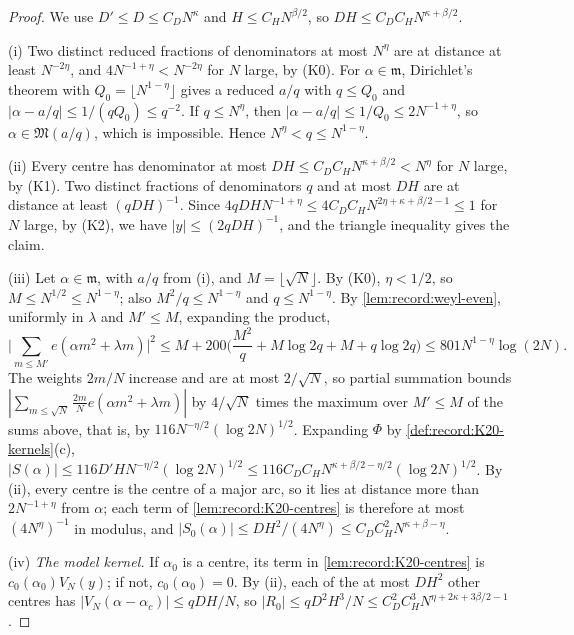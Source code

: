 \begin{proof}
We use $D'\le D\le C_DN^\kappa$ and $H\le C_HN^{\beta/2}$, so
$DH\le C_DC_HN^{\kappa+\beta/2}$.

(i) Two distinct reduced fractions of denominators at most $N^\eta$ are at
distance at least $N^{-2\eta}$, and $4N^{-1+\eta}<N^{-2\eta}$ for $N$ large, by
(K0). For $\alpha\in\mathfrak m$, Dirichlet's theorem with
$Q_0=\lfloor N^{1-\eta}\rfloor$ gives a reduced $a/q$ with $q\le Q_0$ and
$|\alpha-a/q|\le1/(qQ_0)\le q^{-2}$. If $q\le N^\eta$, then
$|\alpha-a/q|\le1/Q_0\le2N^{-1+\eta}$, so $\alpha\in\mathfrak M(a/q)$, which is
impossible. Hence $N^\eta<q\le N^{1-\eta}$.

(ii) Every centre has denominator at most
$DH\le C_DC_HN^{\kappa+\beta/2}<N^\eta$ for $N$ large, by (K1). Two distinct
fractions of denominators $q$ and at most $DH$ are at distance at least
$(qDH)^{-1}$. Since $4qDHN^{-1+\eta}\le4C_DC_HN^{2\eta+\kappa+\beta/2-1}\le1$
for $N$ large, by (K2), we have $|y|\le(2qDH)^{-1}$, and the triangle
inequality gives the claim.

(iii) Let $\alpha\in\mathfrak m$, with $a/q$ from (i), and
$M=\lfloor\sqrt N\rfloor$. By (K0), $\eta<1/2$, so $M\le N^{1/2}\le N^{1-\eta}$;
also $M^2/q\le N^{1-\eta}$ and $q\le N^{1-\eta}$. By
\cref{lem:record:weyl-even}, uniformly in $\lambda$ and $M'\le M$, expanding
the product,
\[
 \Big|\sum_{m\le M'}e(\alpha m^2+\lambda m)\Big|^2\le M+200\Big(\frac{M^2}q
 +M\log2q+M+q\log2q\Big)\le801N^{1-\eta}\log(2N).
\]
The weights $2m/N$ increase and are at most $2/\sqrt N$, so partial summation
bounds $|\sum_{m\le\sqrt N}\frac{2m}Ne(\alpha m^2+\lambda m)|$ by $4/\sqrt N$
times the maximum over $M'\le M$ of the sums above, that is, by
$116N^{-\eta/2}(\log2N)^{1/2}$. Expanding $\Phi$ by
\cref{def:record:K20-kernels}(c),
$|S(\alpha)|\le116D'HN^{-\eta/2}(\log2N)^{1/2}
\le116C_DC_HN^{\kappa+\beta/2-\eta/2}(\log2N)^{1/2}$.
By (ii), every centre is the centre of a major arc, so it lies at distance
more than $2N^{-1+\eta}$ from $\alpha$; each term of
\cref{lem:record:K20-centres} is therefore at most $(4N^\eta)^{-1}$ in modulus,
and $|S_0(\alpha)|\le DH^2/(4N^\eta)\le C_DC_H^2N^{\kappa+\beta-\eta}$.

(iv) \emph{The model kernel.} If $\alpha_0$ is a centre, its term in
\cref{lem:record:K20-centres} is $c_0(\alpha_0)V_N(y)$; if not,
$c_0(\alpha_0)=0$. By (ii), each of the at most $DH^2$ other centres has
$|V_N(\alpha-\alpha_c)|\le qDH/N$, so
$|R_0|\le qD^2H^3/N\le C_D^2C_H^3N^{\eta+2\kappa+3\beta/2-1}$.


\end{proof}
